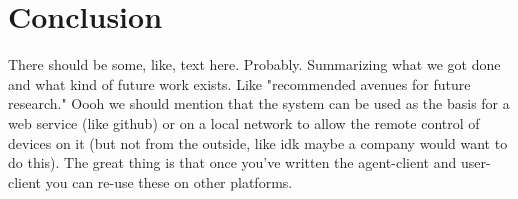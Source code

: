 \chapter{Conclusion}
There should be some, like, text here.
Probably.
Summarizing what we got done and what kind of future work exists.
Like "recommended avenues for future research."
Oooh we should mention that the system can be used as the basis for a web service (like github) or on a local network to allow the remote control of devices on it (but not from the outside, like idk maybe a company would want to do this).
The great thing is that once you've written the agent-client and user-client you can re-use these on other platforms.
